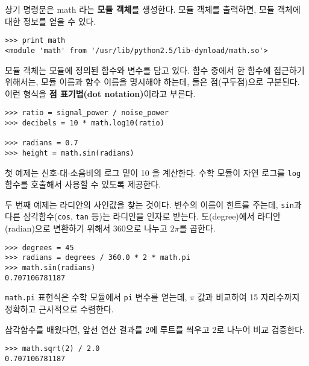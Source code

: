상기 명령문은 math 라는 {\bf 모듈 객체}를 생성한다. 
모듈 객체를 출력하면, 모듈 객체에 대한 정보를 얻을 수 있다.

\beforeverb
\begin{verbatim}
>>> print math
<module 'math' from '/usr/lib/python2.5/lib-dynload/math.so'>
\end{verbatim}
\afterverb
%

모듈 객체는 모듈에 정의된 함수와 변수를 담고 있다. 
함수 중에서 한 함수에 접근하기 위해서는, 모듈 이름과 함수 이름을 명시해야 하는데, 둘은 점(구두점)으로 구분된다.
이런 형식을 {\bf 점 표기법(dot notation)}이라고 부른다.


\beforeverb
\begin{verbatim}
>>> ratio = signal_power / noise_power
>>> decibels = 10 * math.log10(ratio)

>>> radians = 0.7
>>> height = math.sin(radians)
\end{verbatim}
\afterverb
%

첫 예제는 신호-대-소음비의 로그 밑이 10 을 계산한다.
수학 모듈이 자연 로그를 {\tt log} 함수를 호출해서 사용할 수 있도록 제공한다.


두 번째 예제는 라디안의 사인값을 찾는 것이다. 
변수의 이름이 힌트를 주는데, {\tt sin}과 다른 삼각함수({\tt cos}, {\tt tan} 등)는 라디안을 인자로 받는다.
도(degree)에서 라디안(radian)으로 변환하기 위해서 360으로 나누고 $2\pi$를 곱한다.

\beforeverb
\begin{verbatim}
>>> degrees = 45
>>> radians = degrees / 360.0 * 2 * math.pi
>>> math.sin(radians)
0.707106781187
\end{verbatim}
\afterverb
%

{\tt math.pi} 표현식은 수학 모듈에서 {\tt pi} 변수를 얻는데, $\pi$ 값과 비교하여 15 자리수까지 정확하고 근사적으로 수렴한다.


삼각함수를 배웠다면, 앞선 연산 결과를 2에 루트를 씌우고 2로 나누어 비교 검증한다.


\beforeverb
\begin{verbatim}
>>> math.sqrt(2) / 2.0
0.707106781187
\end{verbatim}
\afterverb
%

